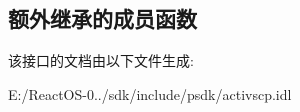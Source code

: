 \subsection*{额外继承的成员函数}


该接口的文档由以下文件生成\+:\begin{DoxyCompactItemize}
\item 
E\+:/\+React\+O\+S-\/0../sdk/include/psdk/activscp.\+idl\end{DoxyCompactItemize}
